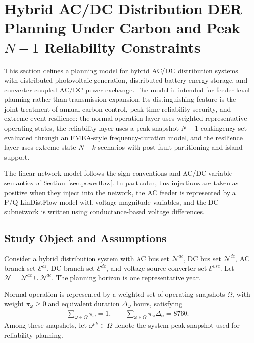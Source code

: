 \section{Hybrid AC/DC Distribution DER Planning Under Carbon and Peak \texorpdfstring{$N{-}1$}{N-1} Reliability Constraints}

This section defines a planning model for hybrid AC/DC distribution systems with distributed photovoltaic generation, distributed battery energy storage, and converter-coupled AC/DC power exchange. The model is intended for feeder-level planning rather than transmission expansion. Its distinguishing feature is the joint treatment of annual carbon control, peak-time reliability security, and extreme-event resilience: the normal-operation layer uses weighted representative operating states, the reliability layer uses a peak-snapshot \(N{-}1\) contingency set evaluated through an FMEA-style frequency-duration model, and the resilience layer uses extreme-state \(N{-}k\) scenarios with post-fault partitioning and island support.

The linear network model follows the sign conventions and AC/DC variable semantics of Section~\ref{sec:powerflow}. In particular, bus injections are taken as positive when they inject into the network, the AC feeder is represented by a P/Q LinDistFlow model with voltage-magnitude variables, and the DC subnetwork is written using conductance-based voltage differences.

\subsection{Study Object and Assumptions}

Consider a hybrid distribution system with AC bus set \(\mathcal{N}^{ac}\), DC bus set \(\mathcal{N}^{dc}\), AC branch set \(\mathcal{E}^{ac}\), DC branch set \(\mathcal{E}^{dc}\), and voltage-source converter set \(\mathcal{E}^{vsc}\). Let \(\mathcal{N}=\mathcal{N}^{ac}\cup\mathcal{N}^{dc}\). The planning horizon is one representative year.

Normal operation is represented by a weighted set of operating snapshots \(\Omega\), with weight \(\pi_\omega\ge 0\) and equivalent duration \(\Delta_\omega\) hours, satisfying
\begin{align}
\sum_{\omega\in\Omega} \pi_\omega = 1,
\qquad
\sum_{\omega\in\Omega} \pi_\omega\Delta_\omega = 8760.
\end{align}
Among these snapshots, let \(\omega^{pk}\in\Omega\) denote the system peak snapshot used for reliability planning.

